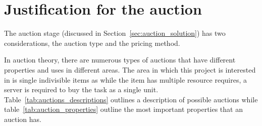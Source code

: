 \section{Justification for the auction} \label{sec:auction_justification}
The auction stage (discussed in Section~\ref{sec:auction_solution}) has two considerations, the auction type and the pricing method.

In auction theory, there are numerous types of auctions that have different properties and uses in different areas.
The area in which this project is interested in is single indivisible items as while the item has multiple resource
requires, a server is required to buy the task as a single unit. Table~\ref{tab:auctions_descriptions} outlines a
description of possible auctions while table~\ref{tab:auction_properties} outline the most important properties that
an auction has.

